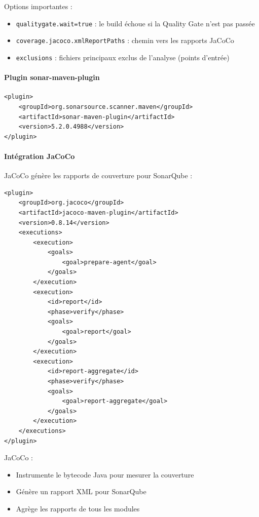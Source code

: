 Options importantes :
\begin{itemize}
    \item \texttt{qualitygate.wait=true} : le build échoue si la Quality Gate n'est pas passée
    \item \texttt{coverage.jacoco.xmlReportPaths} : chemin vers les rapports JaCoCo
    \item \texttt{exclusions} : fichiers principaux exclus de l'analyse (points d'entrée)
\end{itemize}

\paragraph{Plugin sonar-maven-plugin}

\vspace{0.3cm}
\begin{lstlisting}[language=enhancedxml, caption=Plugin SonarQube Maven]
<plugin>
    <groupId>org.sonarsource.scanner.maven</groupId>
    <artifactId>sonar-maven-plugin</artifactId>
    <version>5.2.0.4988</version>
</plugin>
\end{lstlisting}

\paragraph{Intégration JaCoCo}

JaCoCo génère les rapports de couverture pour SonarQube :
\begin{lstlisting}[language=enhancedxml, caption=Configuration JaCoCo]
<plugin>
    <groupId>org.jacoco</groupId>
    <artifactId>jacoco-maven-plugin</artifactId>
    <version>0.8.14</version>
    <executions>
        <execution>
            <goals>
                <goal>prepare-agent</goal>
            </goals>
        </execution>
        <execution>
            <id>report</id>
            <phase>verify</phase>
            <goals>
                <goal>report</goal>
            </goals>
        </execution>
        <execution>
            <id>report-aggregate</id>
            <phase>verify</phase>
            <goals>
                <goal>report-aggregate</goal>
            </goals>
        </execution>
    </executions>
</plugin>
\end{lstlisting}

JaCoCo :
\begin{itemize}
    \item Instrumente le bytecode Java pour mesurer la couverture
    \item Génère un rapport XML pour SonarQube
    \item Agrège les rapports de tous les modules
\end{itemize}

